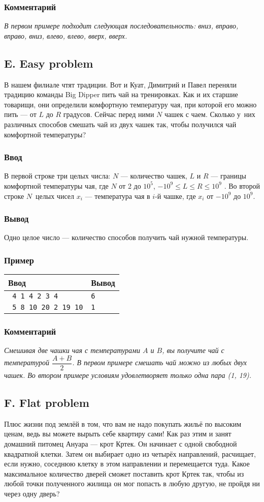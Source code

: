 \documentclass[10pt, a4paper]{article}
\newcommand{\informat}[1]
{
	\subsubsection*{Ввод} #1
}
\newcommand{\outformat}[1]
{
	\subsubsection*{Вывод} #1
}
\newcommand{\examplee}[4]
{
	\subsubsection*{Пример}
	\noindent
	\begin{center}
	\begin{tabularx}{\linewidth}{|X|X|}
	\hline
	Ввод 	& Вывод  	\\
	\hline
	{\tt #1} & {\tt #2}	\\
	\hline
	{\tt #3} & {\tt #4}	\\
	\hline
	\end{tabularx}
	\end{center}
}
\newcommand{\excomm}[1]
{
	\subsubsection*{Комментарий}
	\textit{#1}
}
\begin{document}
\excomm{В первом примере подходит следующая последовательность: вниз, впра\-во, впра\-во, вниз, влево, влево, вверх, вверх.}





\subsection*{E. Easy problem}


В нашем филиале чтят традиции. Вот и Куат, Димитрий и Павел переняли традицию команды Big Dipper пить чай на тренировках. Как и их старшие товарищи, они определили комфортную температуру чая, при которой его мож\-но пить --- от $L$ до $R$ градусов. Сейчас перед ними $N$ чашек с чаем. Сколько у~них различных способов смешать чай из двух чашек так, чтобы получился чай комфортной температуры?

\informat{В первой строке три целых числа: $N$ --- количество чашек, $L$ и $R$ --- границы комфортной температуры чая, где $N$ от 2 до $10^5$, $-10^9 \leqslant L \leqslant R \leqslant 10^9$ . \newline
Во второй строке $N$~целых чисел $x_i$ --- температура чая в $i$-й чашке, где $x_i$ от $-10^9$ до $10^9$.}

\outformat{Одно целое число --- количество способов получить чай нужной температуры.}
 
\examplee{
4 1 4 \newline 
1 2 3 4}
{6}
{
5 8 10 \newline
1 20 2 19 10}
{1}

\excomm{Смешивая две чашки чая с температурами $A$ и $B$, вы получите чай с тем\-пе\-ра\-ту\-рой $\dfrac{A+B}{2}$. В первом примере смешать чай можно из любых двух чашек. Во втором примере условиям удовлетворяет только одна пара (1, 19).}
 


\subsection*{F. Flat problem}

 
Плюс жизни под землёй в том, что вам не надо покупать жильё по высоким ценам, ведь вы можете вырыть себе квартиру сами! Как раз этим и занят домашний питомец Ануара --- крот Кртек. Он начинает с одной свободной квадратной клетки. Затем он выбирает одно из четырёх направлений, рас\-чи\-ща\-ет, если нужно, соседнюю клетку в этом направлении и перемещается туда. Какое максимальное количество дверей сможет поставить крот Кртек так, чтобы из любой точки полученного жилища он мог попасть в любую другую, не пройдя ни через одну дверь? 
 
\end{document}
